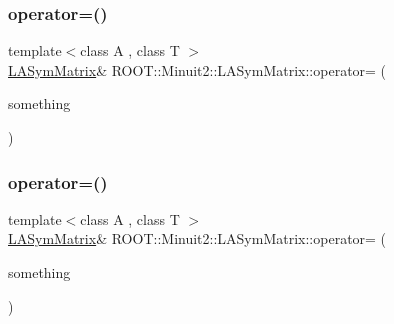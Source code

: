 \subsubsection{\texorpdfstring{operator=()}{operator=()}\hspace{0.1cm}{\footnotesize\ttfamily [7/21]}}
{\footnotesize\ttfamily template$<$class A , class T $>$ \\
\mbox{\hyperlink{classROOT_1_1Minuit2_1_1LASymMatrix}{L\+A\+Sym\+Matrix}}\& R\+O\+O\+T\+::\+Minuit2\+::\+L\+A\+Sym\+Matrix\+::operator= (\begin{DoxyParamCaption}\item[{const \mbox{\hyperlink{classROOT_1_1Minuit2_1_1ABObj}{A\+B\+Obj}}$<$ \mbox{\hyperlink{classROOT_1_1Minuit2_1_1sym}{sym}}, \mbox{\hyperlink{classROOT_1_1Minuit2_1_1ABObj}{A\+B\+Obj}}$<$ \mbox{\hyperlink{classROOT_1_1Minuit2_1_1sym}{sym}}, A, T $>$, T $>$ \&}]{something }\end{DoxyParamCaption})\hspace{0.3cm}{\ttfamily [inline]}}

\mbox{\label{classROOT_1_1Minuit2_1_1LASymMatrix_ad9610e3f4b18a52ab16644373e179acc}} 
\subsubsection{\texorpdfstring{operator=()}{operator=()}\hspace{0.1cm}{\footnotesize\ttfamily [8/21]}}
{\footnotesize\ttfamily template$<$class A , class T $>$ \\
\mbox{\hyperlink{classROOT_1_1Minuit2_1_1LASymMatrix}{L\+A\+Sym\+Matrix}}\& R\+O\+O\+T\+::\+Minuit2\+::\+L\+A\+Sym\+Matrix\+::operator= (\begin{DoxyParamCaption}\item[{const \mbox{\hyperlink{classROOT_1_1Minuit2_1_1ABObj}{A\+B\+Obj}}$<$ \mbox{\hyperlink{classROOT_1_1Minuit2_1_1sym}{sym}}, \mbox{\hyperlink{classROOT_1_1Minuit2_1_1ABObj}{A\+B\+Obj}}$<$ \mbox{\hyperlink{classROOT_1_1Minuit2_1_1sym}{sym}}, A, T $>$, T $>$ \&}]{something }\end{DoxyParamCaption})\hspace{0.3cm}{\ttfamily [inline]}}

\mbox{\label{classROOT_1_1Minuit2_1_1LASymMatrix_ad9610e3f4b18a52ab16644373e179acc}} 
